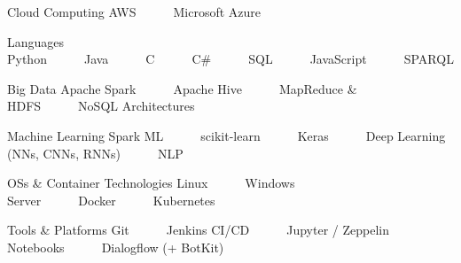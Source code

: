 

\begin{cvskills}

\cvskill
{Cloud Computing} %
{AWS~~~\textbullet~~~Microsoft Azure} %

  \cvskill
    {Languages} %
    {Python~~~\textbullet~~~Java~~~\textbullet~~~C~~~\textbullet~~~C\#~~~\textbullet~~~SQL~~~\textbullet~~~JavaScript~~~\textbullet~~~SPARQL} %

  \cvskill
    {Big Data} %
    {Apache Spark~~~\textbullet~~~Apache Hive~~~\textbullet~~~MapReduce \& HDFS~~~\textbullet~~~NoSQL Architectures} %

  \cvskill
    {Machine Learning} %
    {Spark ML~~~\textbullet~~~scikit-learn~~~\textbullet~~~Keras~~~\textbullet~~~Deep Learning (NNs, CNNs, RNNs)~~~\textbullet~~~NLP} %

  \cvskill
    {OSs \& Container Technologies} %
    {Linux~~~\textbullet~~~Windows Server~~~\textbullet~~~Docker~~~\textbullet~~~Kubernetes} %

  \cvskill
    {Tools \& Platforms} %
    {Git~~~\textbullet~~~Jenkins CI/CD~~~\textbullet~~~Jupyter / Zeppelin Notebooks~~~\textbullet~~~Dialogflow (+ BotKit)} %

\end{cvskills}
